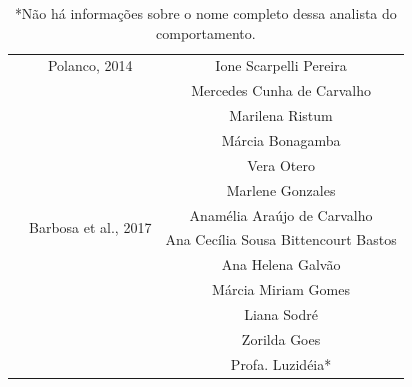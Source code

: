 \begin{table}[]
\begin{adjustbox}{max width=1\textwidth}
\begin{tabular}{@{}ccc@{}}
\multicolumn{1}{c|}{}                                                      & \multicolumn{1}{c|}{Polanco, 2014}                            & Ione Scarpelli Pereira                      \\ \cmidrule(l){2-3} 
\multicolumn{1}{c|}{}                                                      & \multicolumn{1}{c|}{\multirow{12}{*}{Barbosa et al., 2017}}   & Mercedes Cunha de Carvalho                  \\
\multicolumn{1}{c|}{}                                                      & \multicolumn{1}{c|}{}                                         & Marilena Ristum                             \\
\multicolumn{1}{c|}{}                                                      & \multicolumn{1}{c|}{}                                         & Márcia Bonagamba                            \\
\multicolumn{1}{c|}{}                                                      & \multicolumn{1}{c|}{}                                         & Vera Otero                                  \\
\multicolumn{1}{c|}{}                                                      & \multicolumn{1}{c|}{}                                         & Marlene Gonzales                            \\
\multicolumn{1}{c|}{}                                                      & \multicolumn{1}{c|}{}                                         & Anamélia Araújo de Carvalho                 \\
\multicolumn{1}{c|}{}                                                      & \multicolumn{1}{c|}{}                                         & Ana Cecília Sousa Bittencourt Bastos        \\
\multicolumn{1}{c|}{}                                                      & \multicolumn{1}{c|}{}                                         & Ana Helena Galvão                           \\
\multicolumn{1}{c|}{}                                                      & \multicolumn{1}{c|}{}                                         & Márcia Miriam Gomes                         \\
\multicolumn{1}{c|}{}                                                      & \multicolumn{1}{c|}{}                                         & Liana Sodré                                 \\
\multicolumn{1}{c|}{}                                                      & \multicolumn{1}{c|}{}                                         & Zorilda Goes                                \\
\multicolumn{1}{c|}{}                                                      & \multicolumn{1}{c|}{}                                         & Profa. Luzidéia*                           
\end{tabular}
\end{adjustbox}
\caption*{*Não há informações sobre o nome completo dessa analista do comportamento.}
\end{table}

